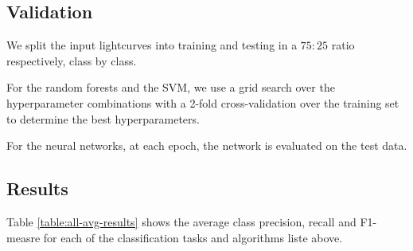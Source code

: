 \documentclass{aastex62}
\begin{document}
\subsection{Validation} \label{subsection_importances}

We split the input lightcurves into training and testing in a $75:25$ ratio respectively, class by class.


For the random forests and the SVM, we use a grid search over the hyperparameter combinations with a 2-fold cross-validation over the training set to determine the best hyperparameters. 

For the neural networks, at each epoch, the network is evaluated on the test data. 


\subsection{Results}

Table \ref{table:all-avg-results} shows the average class precision, recall and F1-measre for each of the classification tasks and algorithms liste above. 
\end{document}
